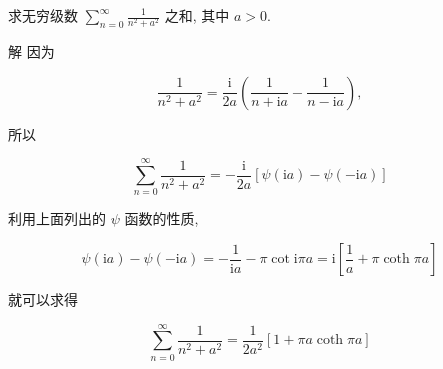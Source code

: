 \begin{examplebox}{求无穷级数 $\sum_{n=0}^{\infty} \frac{1}{n^{2}+a^{2}}$ 之和, 其中 $a>0$.}

解 因为

$$
\frac{1}{n^{2}+a^{2}}=\frac{\mathrm{i}}{2 a}\left(\frac{1}{n+\mathrm{i} a}-\frac{1}{n-\mathrm{i} a}\right),
$$

所以

$$
\sum_{n=0}^{\infty} \frac{1}{n^{2}+a^{2}}=-\frac{\mathrm{i}}{2 a}[\psi(\mathrm{i} a)-\psi(-\mathrm{i} a)]
$$

利用上面列出的 $\psi$ 函数的性质,

$$
\psi(\mathrm{i} a)-\psi(-\mathrm{i} a)=-\frac{1}{\mathrm{i} a}-\pi \cot \mathrm{i} \pi a=\mathrm{i}\left[\frac{1}{a}+\pi \operatorname{coth} \pi a\right]
$$

就可以求得

$$
\sum_{n=0}^{\infty} \frac{1}{n^{2}+a^{2}}=\frac{1}{2 a^{2}}[1+\pi a \operatorname{coth} \pi a]
$$
\end{examplebox}